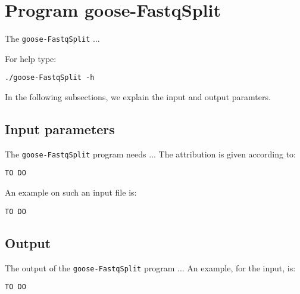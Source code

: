 \section{Program goose-FastqSplit}
The \texttt{goose-FastqSplit} ...

For help type:
\begin{lstlisting}
./goose-FastqSplit -h
\end{lstlisting}
In the following subsections, we explain the input and output paramters.

\subsection{Input parameters}

The \texttt{goose-FastqSplit} program needs ...
The attribution is given according to:
\begin{lstlisting}
TO DO
\end{lstlisting}

An example on such an input file is:
\begin{lstlisting}
TO DO
\end{lstlisting}

\subsection{Output}
The output of the \texttt{goose-FastqSplit} program ...
An example, for the input, is:
\begin{lstlisting}
TO DO
\end{lstlisting}
